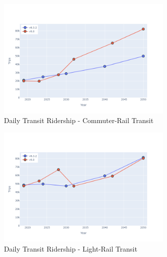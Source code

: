\documentclass[
  letterpaper,
  DIV=11,
  numbers=noendperiod]{scrreprt}
\begin{document}
\begin{figure}[H]

{\centering \includegraphics[width=0.76\textwidth,height=\textheight]{v9x/v900/whats-new/_pictures/pdf-hy-tr-crt.png}

}

\caption{\label{fig-pdf-hy-tr-crt}Daily Transit Ridership -
Commuter-Rail Transit}

\end{figure}

\begin{figure}[H]

{\centering \includegraphics[width=0.76\textwidth,height=\textheight]{v9x/v900/whats-new/_pictures/pdf-hy-tr-lrt.png}

}

\caption{\label{fig-pdf-hy-tr-lrt}Daily Transit Ridership - Light-Rail
Transit}

\end{figure}
\end{document}
